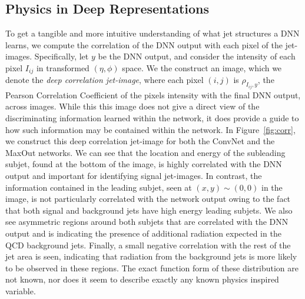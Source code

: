 \clearpage
\newpage

\subsection{Physics in Deep Representations} %
\label{ssub:physics_in_deep_representations}
To get a tangible and more intuitive understanding of what jet structures a DNN learns, we compute the correlation of the DNN output with each pixel of the jet-images. Specifically, let $y$ be the DNN output, and consider the intensity of each pixel $I_{ij}$ in transformed $(\eta, \phi)$ space. We the construct an image, which we denote the \emph{deep correlation jet-image}, where each pixel $(i, j)$ is $\rho_{I_{ij}, y}$, the Pearson Correlation Coefficient of the pixels intensity with the final DNN output, across images. While this this image does not give a direct view of the discriminating information learned within the network, it does provide a guide to how such information may be contained within the network.  In Figure~\ref{fig:corr}, we construct this deep correlation jet-image for both the ConvNet and the MaxOut networks.  We can see that the location and energy of the subleading subjet, found at the bottom of the image, is highly correlated with the DNN output and important for identifying signal jet-images.  In contrast, the information contained in the leading subjet, seen at $(x,y)\sim (0,0)$ in the image, is not particularly correlated with the network output owing to the fact that both signal and background jets have high energy leading subjets.  We also see asymmetric regions around both subjets that are correlated with the DNN output and is indicating the presence of additional radiation expected in the QCD background jets.  Finally, a small negative correlation with the rest of the jet area is seen, indicating that radiation from the background jets is more likely to be observed in these regions.   The exact function form of these distribution are not known, nor does it seem to describe exactly any known physics inspired variable.

